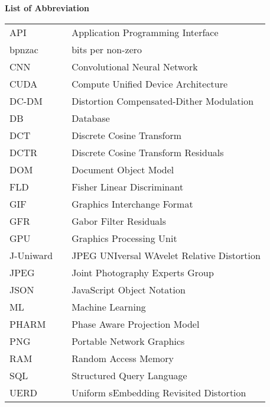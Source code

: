 
\begin{flushleft}
    \Huge{\textbf{List of Abbreviation}}\vspace{1cm}\\
\end{flushleft}
\normalsize{\begin{tabular}{l l l}
    API         && Application Programming Interface\\
    bpnzac      && bits per non-zero\\
    CNN         && Convolutional Neural Network\\
    CUDA        && Compute Unified Device Architecture\\
    DC-DM       && Distortion Compensated-Dither Modulation\\
    DB          && Database\\
    DCT         && Discrete Cosine Transform\\
    DCTR        && Discrete Cosine Transform Residuals\\
    DOM         && Document Object Model\\
    FLD         && Fisher Linear Discriminant\\
    GIF         && Graphics Interchange Format\\
    GFR         && Gabor Filter Residuals\\
    GPU         && Graphics Processing Unit\\
    J-Uniward   && JPEG UNIversal WAvelet Relative Distortion\\
    JPEG       & & Joint Photography Experts Group\\
    JSON        && JavaScript Object Notation\\
    ML          && Machine Learning\\
    PHARM       && Phase Aware Projection Model\\
    PNG         && Portable Network Graphics\\
    RAM         && Random Access Memory\\
    SQL        & & Structured Query Language\\
    UERD       & & Uniform sEmbedding Revisited Distortion\\ 
\end{tabular} }

